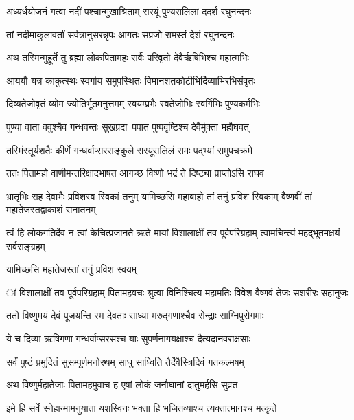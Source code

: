 
\twolineshloka
{अध्यर्धयोजनं गत्वा नदीं पश्चान्मुखाश्रिताम्}
{सरयूं पुण्यसलिलां ददर्श रघुनन्दनः} %

\twolineshloka
{तां नदीमाकुलावर्तां सर्वत्रानुसरन्नृपः}
{आगतः सप्रजो रामस्तं देशं रघुनन्दनः} %

\twolineshloka
{अथ तस्मिन्मुहूर्ते तु ब्रह्मा लोकपितामहः}
{सर्वैः परिवृतो देवैर्ऋषिभिश्च महात्मभिः} %

\twolineshloka
{आययौ यत्र काकुत्स्थः स्वर्गाय समुपस्थितः}
{विमानशतकोटीभिर्दिव्याभिरभिसंवृतः} %

\twolineshloka
{दिव्यतेजोवृतं व्योम ज्योतिर्भूतमनुत्तमम्}
{स्वयम्प्रभैः स्वतेजोभिः स्वर्गिभिः पुण्यकर्मभिः} %

\twolineshloka
{पुण्या वाता ववुश्चैव गन्धवन्तः सुखप्रदाः}
{पपात पुष्पवृष्टिश्च देवैर्मुक्ता महौघवत्} %

\twolineshloka
{तस्मिंस्तूर्यशतैः कीर्णे गन्धर्वाप्सरसङ्कुले}
{सरयूसलिलं रामः पद्भ्यां समुपचक्रमे} %

\twolineshloka
{ततः पितामहो वाणीमन्तरिक्षादभाषत}
{आगच्छ विष्णो भद्रं ते दिष्ट्या प्राप्तोऽसि राघव} %

\threelineshloka
{भ्रातृभिः सह देवाभैः प्रविशस्व स्विकां तनुम्}
{यामिच्छसि महाबाहो तां तनुं प्रविश स्विकाम्}
{वैष्णवीं तां महातेजस्तद्वाकाशं सनातनम्} %

\threelineshloka
{त्वं हि लोकगतिर्देव न त्वां केचित्प्रजानते}
{ऋते मायां विशालाक्षीं तव पूर्वपरिग्रहाम्}
{त्वामचिन्त्यं महद्भूतमक्षयं सर्वसङ्ग्रहम्} %

\onelineshloka
{यामिच्छसि महातेजस्तां तनुं प्रविश स्वयम्} %

\threelineshloka
{ां विशालाक्षीं तव पूर्वपरिग्रहाम्}
{पितामहवचः श्रुत्वा विनिश्चित्य महामतिः}
{विवेश वैष्णवं तेजः सशरीरः सहानुजः} %

\twolineshloka
{ततो विष्णुमयं देवं पूजयन्ति स्म देवताः}
{साध्या मरुद्गणाश्चैव सेन्द्राः साग्निपुरोगमाः} %

\twolineshloka
{ये च दिव्या ऋषिगणा गन्धर्वाप्सरसश्च याः}
{सुपर्णनागयक्षाश्च दैत्यदानवराक्षसाः} %

\twolineshloka
{सर्वं पुष्टं प्रमुदितं सुसम्पूर्णमनोरथम्}
{साधु साध्विति तैर्देवैस्त्रिदिवं गतकल्मषम्} %

\twolineshloka
{अथ विष्णुर्महातेजाः पितामहमुवाच ह}
{एषां लोकं जनौघानां दातुमर्हसि सुव्रत} %

\twolineshloka
{इमे हि सर्वे स्नेहान्मामनुयाता यशस्विनः}
{भक्ता हि भजितव्याश्च त्यक्तात्मानश्च मत्कृते} %

